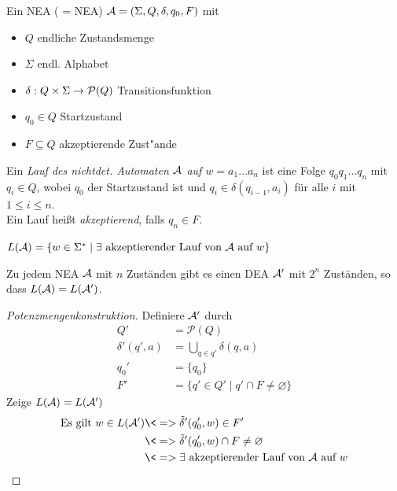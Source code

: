 {\begin{Def}[name={[NEA]}]
	Ein \ac{NEA} ( = \acl{NEA}) $\mathcal{A} = (\Sigma, Q,\delta,q_0,F)$ mit
	\begin{itemize}
		\item $Q$ endliche Zustandsmenge
		\item $\Sigma$ endl. Alphabet
		\item $\delta:Q\x\Sigma\->\mathcal{P}(Q)$ Transitionsfunktion
		\item $q_0\in Q$ Startzustand
		\item $F\subseteq Q$ akzeptierende Zust"ande
	\end{itemize}
\end{Def}
\begin{Def}[name={[Lauf eines Automaten]}]
        Ein \emph{Lauf des nichtdet. Automaten $\mathcal{A}$ auf $w=a_1\dots a_n$} ist eine Folge $q_0q_1\dots q_n$ mit $q_i\in Q$, wobei $q_0$ der Startzustand ist und $q_i\in\delta(q_{i-1},a_i)$ für alle $i$ mit $1\leq i\leq n$.\\
        Ein Lauf heißt \emph{akzeptierend}, falls $q_n\in F$.
\end{Def}
\begin{Def}[name={[NEA zu DEA]}]
	$L(\mathcal{A})=\{ w\in\Sigma^* \mid \exists\text{ akzeptierender Lauf von $\mathcal{A}$ auf }w \}$
\end{Def}
\begin{Satz}[Rabin]
	Zu jedem \ac{NEA} $\mathcal{A}$ mit $n$ Zuständen gibt es einen \ac{DEA} $\mathcal{A}'$ mit $2^n$ Zuständen, so dass $L(\mathcal{A})=L(\mathcal{A}')$.
\end{Satz}
\begin{proof}[Potenzmengenkonstruktion]
        Definiere $\mathcal{A}'$ durch
        \begin{align*}
                Q' &= \mathcal{P}(Q)\\
                \delta'(q',a) &= \bigcup_{q\in q'} \delta(q,a)\\
                q_0' &= \{q_0\}\\
                F' &= \{ q'\in Q' \mid q'\cap F\neq \varnothing \}
        \end{align*}
        Zeige $L(\mathcal{A})=L(\mathcal{A}')$
        \begin{align*}
                \text{Es gilt } w\in L(\A') &\<=> \tilde\delta'(q_0',w)\in F'\\
                &\<=> \tilde\delta'(q_0',w)\cap F\neq \varnothing\\
                &\<=> \exists \text{ akzeptierender Lauf von $\A$ auf $w$} \\

\end{align*}
\end{proof}}
